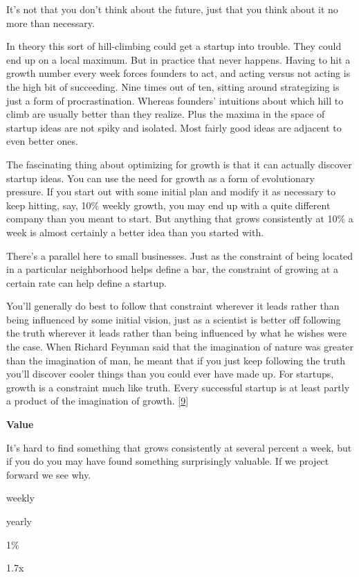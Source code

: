 It's not that you don't think about the future, just that you think
about it no more than necessary.

In theory this sort of hill-climbing could get a startup into trouble.
They could end up on a local maximum. But in practice that never
happens. Having to hit a growth number every week forces founders to
act, and acting versus not acting is the high bit of succeeding. Nine
times out of ten, sitting around strategizing is just a form of
procrastination. Whereas founders' intuitions about which hill to climb
are usually better than they realize. Plus the maxima in the space of
startup ideas are not spiky and isolated. Most fairly good ideas are
adjacent to even better ones.

The fascinating thing about optimizing for growth is that it can
actually discover startup ideas. You can use the need for growth as a
form of evolutionary pressure. If you start out with some initial plan
and modify it as necessary to keep hitting, say, 10\% weekly growth, you
may end up with a quite different company than you meant to start. But
anything that grows consistently at 10\% a week is almost certainly a
better idea than you started with.

There's a parallel here to small businesses. Just as the constraint of
being located in a particular neighborhood helps define a bar, the
constraint of growing at a certain rate can help define a startup.

You'll generally do best to follow that constraint wherever it leads
rather than being influenced by some initial vision, just as a scientist
is better off following the truth wherever it leads rather than being
influenced by what he wishes were the case. When Richard Feynman said
that the imagination of nature was greater than the imagination of man,
he meant that if you just keep following the truth you'll discover
cooler things than you could ever have made up. For startups, growth is
a constraint much like truth. Every successful startup is at least
partly a product of the imagination of growth. {[}\hyperref[f9n]{9}{]}

\textbf{Value}

It's hard to find something that grows consistently at several percent a
week, but if you do you may have found something surprisingly valuable.
If we project forward we see why.

weekly

yearly

1\%

1.7x

